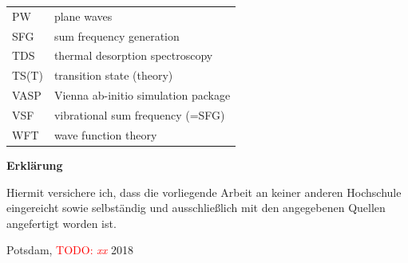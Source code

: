 \documentclass[11pt,DIV=13,BCOR=5mm,a4paper,headinclude]{scrbook}
\newcommand\todo[1]{\textcolor{red}{TODO: \textit{{#1}}}}
\begin{document}
\begin{table}[!h]
\begin{tabular}{ll}
PW & plane waves\\
SFG & sum frequency generation\\
TDS &thermal desorption spectroscopy\\
TS(T) & transition state (theory)\\
VASP & Vienna ab-initio simulation package\\
VSF & vibrational sum frequency (=SFG)\\
WFT & wave function theory\\

  \end{tabular}
\end{table}
\clearpage

\begingroup
\let\clearpage\relax
\renewcommand*{\chapterheadstartvskip}{\vspace*{-2\baselineskip}}
\begin{small}
 
 
\end{small}
\endgroup



\clearpage
\pagestyle{empty}
\begin{center}
  {\Large\sffamily\bfseries Erklärung}
\end{center}

\vspace{\baselineskip}

Hiermit versichere ich, dass die vorliegende Arbeit an keiner anderen Hochschule eingereicht sowie selbständig und ausschließlich mit den angegebenen Quellen angefertigt worden ist.\\

\begin{flushleft}
  Potsdam, \todo{xx} 2018
\end{flushleft}
\end{document}
